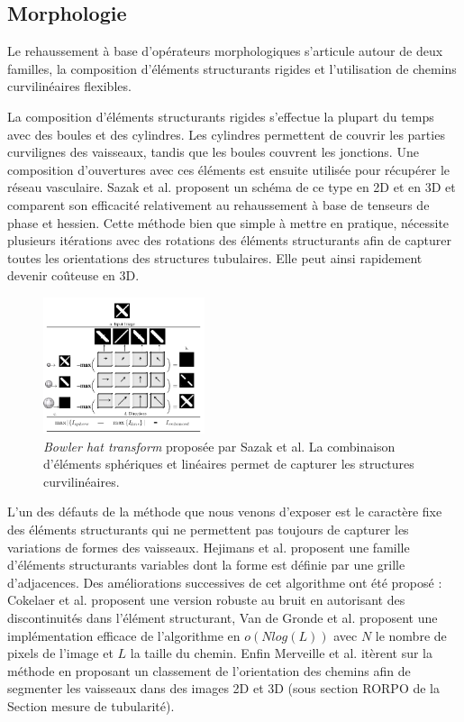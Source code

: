 \subsection{Morphologie}
\label{sec:EA:rehaussement:morpho}

Le rehaussement à base d'opérateurs morphologiques s'articule autour de deux familles, la composition d'éléments structurants rigides et l'utilisation de chemins curvilinéaires flexibles.

La composition d'éléments structurants rigides s'effectue la plupart du temps avec des boules et des cylindres. Les cylindres permettent de couvrir les parties curvilignes des vaisseaux, tandis que les boules couvrent les jonctions. Une composition d'ouvertures avec ces éléments est ensuite utilisée pour récupérer le réseau vasculaire. Sazak et al. proposent un schéma de ce type en 2D \cite{Sazak2019_bowler_hat_2D} et en 3D \cite{Sazak2018_bowler_hat_3D} et comparent son efficacité relativement au rehaussement à base de tenseurs de phase et hessien. Cette méthode bien que simple à mettre en pratique, nécessite plusieurs itérations avec des rotations des éléments structurants afin de capturer toutes les orientations des structures tubulaires. Elle peut ainsi rapidement devenir coûteuse en 3D.

\begin{figure}[h]
  \centering
  \includegraphics[height=4cm]{Images/bowlerHat_3D.png}
  \caption{\textit{Bowler hat transform} proposée par Sazak et al. La combinaison d'éléments sphériques et linéaires permet de capturer les structures curvilinéaires. }
  \label{fig:sazak_bowler_hat}
\end{figure}

L'un des défauts de la méthode que nous venons d'exposer est le caractère fixe des éléments structurants qui ne permettent pas toujours de capturer les variations de formes des vaisseaux. Hejimans et al. \cite{Heijmans2005_path_opening} proposent une famille d'éléments structurants variables dont la forme est définie par une grille d'adjacences. Des améliorations successives de cet algorithme ont été proposé : Cokelaer et al. \cite{Cokelaer2012_efficient_path_opening} proposent une version robuste au bruit en autorisant des discontinuités dans l'élément structurant, Van de Gronde et al. \cite{Gronde2015_fast_path_opening} proposent une implémentation efficace de l'algorithme en $o( N log ( L ))$ avec $N$ le nombre de pixels de l'image et $L$ la taille du chemin. Enfin Merveille et al. \cite{Merveille2018_curvilinear} itèrent sur la méthode en proposant un classement de l'orientation des chemins afin de segmenter les vaisseaux dans des images 2D et 3D (sous section RORPO de la Section mesure de tubularité). 


